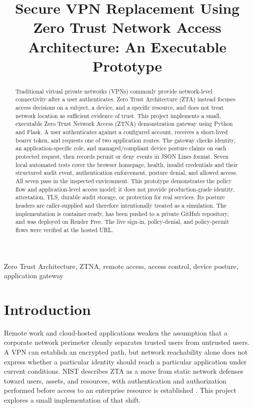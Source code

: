 \documentclass[conference]{IEEEtran}
\title{Secure VPN Replacement Using Zero Trust Network Access Architecture: An Executable Prototype}
\author{\IEEEauthorblockN{Student Name}\IEEEauthorblockA{Department / Institution\ \texttt{student@example.edu}}}
\begin{document}
\maketitle
\begin{abstract}
Traditional virtual private networks (VPNs) commonly provide network-level connectivity after a user authenticates. Zero Trust Architecture (ZTA) instead focuses access decisions on a subject, a device, and a specific resource, and does not treat network location as sufficient evidence of trust. This project implements a small, executable Zero Trust Network Access (ZTNA) demonstration gateway using Python and Flask. A user authenticates against a configured account, receives a short-lived bearer token, and requests one of two application routes. The gateway checks identity, an application-specific role, and managed/compliant device posture claims on each protected request, then records permit or deny events in JSON Lines format. Seven local automated tests cover the browser homepage, health, invalid credentials and their structured audit event, authentication enforcement, posture denial, and allowed access. All seven pass in the inspected environment. This prototype demonstrates the policy flow and application-level access model; it does not provide production-grade identity, attestation, TLS, durable audit storage, or protection for real services. Its posture headers are caller-supplied and therefore intentionally treated as a simulation. The implementation is container-ready, has been pushed to a private GitHub repository, and was deployed on Render Free. The live sign-in, policy-denial, and policy-permit flows were verified at the hosted URL.
\end{abstract}
\begin{IEEEkeywords}
Zero Trust Architecture, ZTNA, remote access, access control, device posture, application gateway
\end{IEEEkeywords}

\section{Introduction}
Remote work and cloud-hosted applications weaken the assumption that a corporate network perimeter cleanly separates trusted users from untrusted users. A VPN can establish an encrypted path, but network reachability alone does not express whether a particular identity should reach a particular application under current conditions. NIST describes ZTA as a move from static network defenses toward users, assets, and resources, with authentication and authorization performed before access to an enterprise resource is established \cite{nist207}. This project explores a small implementation of that shift.
\end{document}
